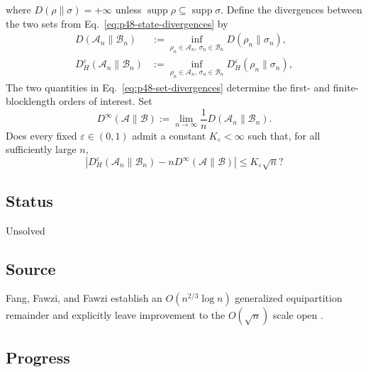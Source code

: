 where $D(\rho\|\sigma)=+\infty$ unless
$\operatorname{supp}\rho\subseteq\operatorname{supp}\sigma$.  Define the
divergences between the two sets from Eq.~\eqref{eq:p48-state-divergences} by
\begin{equation}
  \begin{aligned}
  D(\mathcal A_n\|\mathcal B_n)
    &:=\inf_{\rho_n\in\mathcal A_n,\,\sigma_n\in\mathcal B_n}
      D(\rho_n\|\sigma_n),\\
  D_H^\varepsilon(\mathcal A_n\|\mathcal B_n)
    &:=\inf_{\rho_n\in\mathcal A_n,\,\sigma_n\in\mathcal B_n}
      D_H^\varepsilon(\rho_n\|\sigma_n),
  \end{aligned}
  \label{eq:p48-set-divergences}
\end{equation}
The two quantities in Eq.~\eqref{eq:p48-set-divergences} determine the
first- and finite-blocklength orders of interest.  Set
\begin{equation}
  D^\infty(\mathcal A\|\mathcal B)
  :=\lim_{n\to\infty}\frac1nD(\mathcal A_n\|\mathcal B_n).
  \label{eq:p48-regularized-set-entropy}
\end{equation}
Does every fixed $\varepsilon\in(0,1)$ admit a constant
$K_\varepsilon<\infty$ such that, for all sufficiently large $n$,
\begin{equation}
  \left|D_H^\varepsilon(\mathcal A_n\|\mathcal B_n)
       -nD^\infty(\mathcal A\|\mathcal B)\right|
  \leq K_\varepsilon\sqrt n?
  \label{eq:p48-square-root-remainder}
\end{equation}

\subsection*{Status}

Unsolved

\subsection*{Source}

Fang, Fawzi, and Fawzi establish an $O(n^{2/3}\log n)$ generalized
equipartition remainder and explicitly leave improvement to the
$O(\sqrt n)$ scale open .

\subsection*{Progress}

